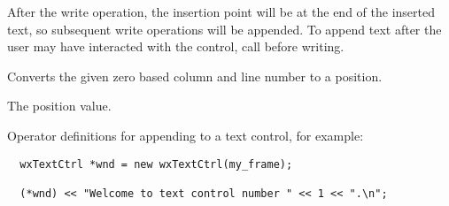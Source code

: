 After the write operation, the insertion point will be at the end of the inserted text, so subsequent write operations will be appended. To append text after the user may have interacted with the control, call  before writing.

\label{wxtextctrlxytoposition}


Converts the given zero based column and line number to a position.





The position value.

\label{wxtextctrlinsert}







Operator definitions for appending to a text control, for example:

\begin{verbatim}
  wxTextCtrl *wnd = new wxTextCtrl(my_frame);

  (*wnd) << "Welcome to text control number " << 1 << ".\n";
\end{verbatim}


